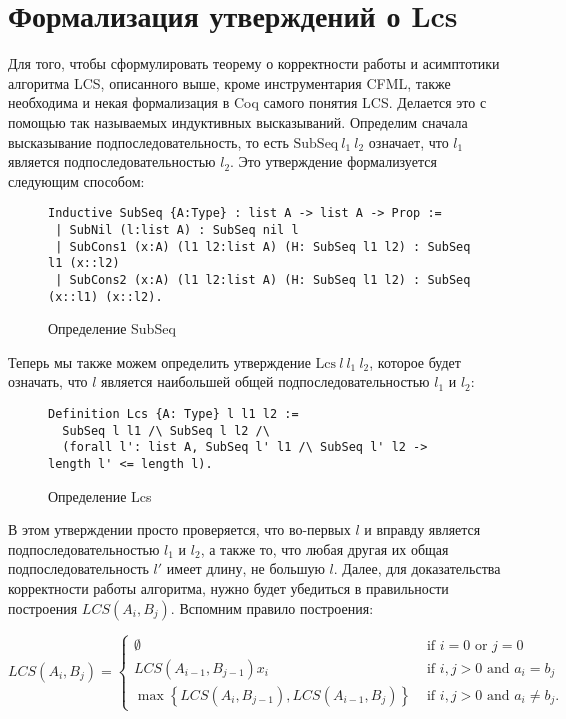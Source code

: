 \section{Формализация утверждений о Lcs}
Для того, чтобы сформулировать теорему о корректности работы и асимптотики алгоритма LCS, описанного выше, кроме инструментария
CFML, также необходима и некая формализация в Coq самого понятия LCS. Делается это с помощью так называемых индуктивных высказываний.
Определим сначала высказывание подпоследовательность, то есть $\text{SubSeq}\ l_1\ l_2$ означает, что $l_1$ является подпоследовательностью
$l_2$. Это утверждение формализуется следующим способом:


\begin{figure}[H]
  \caption{Определение SubSeq}
  \label{code:subseq_prop}
  \begin{verbatim}
Inductive SubSeq {A:Type} : list A -> list A -> Prop :=
 | SubNil (l:list A) : SubSeq nil l
 | SubCons1 (x:A) (l1 l2:list A) (H: SubSeq l1 l2) : SubSeq l1 (x::l2)
 | SubCons2 (x:A) (l1 l2:list A) (H: SubSeq l1 l2) : SubSeq (x::l1) (x::l2).
  \end{verbatim}
\end{figure}

Теперь мы также можем определить утверждение $\text{Lcs}\ l\ l_1\ l_2$, которое будет означать, что $l$ является наибольшей
общей подпоследовательностью $l_1$ и $l_2$:

\begin{figure}[H]
  \caption{Определение Lcs}
  \label{code:lcs_prop}
  \begin{verbatim}
Definition Lcs {A: Type} l l1 l2 :=
  SubSeq l l1 /\ SubSeq l l2 /\ 
  (forall l': list A, SubSeq l' l1 /\ SubSeq l' l2 -> length l' <= length l). 
  \end{verbatim}
\end{figure}

В этом утверждении просто проверяется, что во-первых $l$ и вправду является подпоследовательностью $l_1$ и $l_2$, а также то,
что любая другая их общая подпоследовательность $l'$ имеет длину, не большую $l$. Далее, для доказательства корректности работы
алгоритма, нужно будет убедиться в правильности построения $LCS(A_i, B_j)$. Вспомним правило построения:

$$
  L C S\left(A_{i}, B_{j}\right)=\left\{\begin{array}{ll}
    \emptyset                                                                              & \text { if } i=0 \text { or } j=0                    \\
    L C S\left(A_{i-1}, B_{j-1}\right) x_{i}                                               & \text { if } i, j>0 \text { and } a_{i}=b_{j}        \\
    \max \left\{L C S\left(A_{i}, B_{j-1}\right), L C S\left(A_{i-1}, B_{j}\right)\right\} & \text { if } i, j>0 \text { and } a_{i} \neq b_{j} .
  \end{array}\right.
$$

